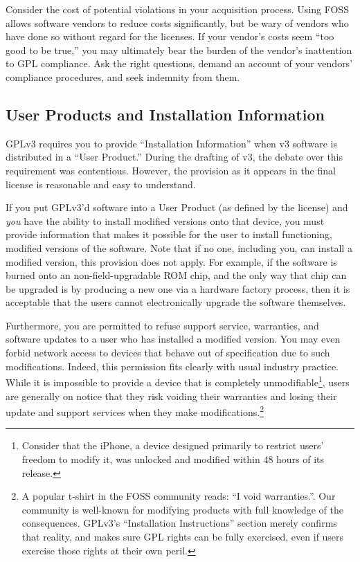\documentclass[letterpaper]{fixme}
\begin{document}
Consider the cost of potential violations in your acquisition process.
Using FOSS allows software vendors to reduce costs significantly, but be
wary of vendors who have done so without regard for the licenses.  If your
vendor's costs seem ``too good to be true,'' you may ultimately bear the
burden of the vendor's inattention to GPL compliance.  Ask the right
questions, demand an account of your vendors' compliance procedures, and
seek indemnity from them.

\subsection{User Products and Installation Information}
\label{user-products}

GPLv3 requires you to provide ``Installation Information'' when v3
software is distributed in a ``User Product.''  During the drafting of v3,
the debate over this requirement was contentious.  However, the provision
as it appears in the final license is reasonable and easy to understand.

If you put GPLv3'd software into a User Product (as defined by the
license) and \emph{you} have the ability to install modified versions onto
that device, you must provide information that makes it possible for the
user to install functioning, modified versions of the software.  Note that
if no one, including you, can install a modified version, this provision
does not apply.  For example, if the software is burned onto an
non-field-upgradable ROM chip, and the only way that chip can be upgraded
is by producing a new one via a hardware factory process, then it is
acceptable that the users cannot electronically upgrade the software
themselves.

Furthermore, you are permitted to refuse support service, warranties, and
software updates to a user who has installed a modified version.  You may
even forbid network access to devices that behave out of specification due
to such modifications.  Indeed, this permission fits clearly with usual
industry practice.  While it is impossible to provide a device that is
completely unmodifiable\footnote{Consider that the iPhone, a device
  designed primarily to restrict users' freedom to modify it, was unlocked
  and modified within 48 hours of its release.}, users are generally on
notice that they risk voiding their warranties and losing their update and
support services when they make modifications.\footnote{A popular t-shirt
  in the FOSS community reads: ``I void warranties.''.  Our community is
  well-known for modifying products with full knowledge of the
  consequences.  GPLv3's ``Installation Instructions'' section merely
  confirms that reality, and makes sure GPL rights can be fully exercised,
  even if users exercise those rights at their own peril.}
\end{document}
